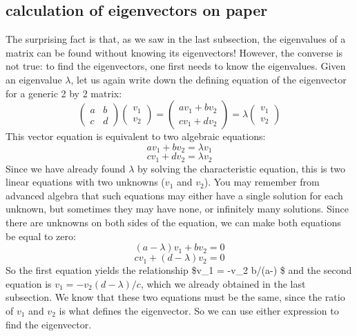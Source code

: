 \documentclass[
  letterpaper,
  DIV=11,
  numbers=noendperiod]{scrreprt}
\begin{document}
\hypertarget{calculation-of-eigenvectors-on-paper}{%
\subsection{calculation of eigenvectors on
paper}\label{calculation-of-eigenvectors-on-paper}}

The surprising fact is that, as we saw in the last subsection, the
eigenvalues of a matrix can be found without knowing its eigenvectors!
However, the converse is not true: to find the eigenvectors, one first
needs to know the eigenvalues. Given an eigenvalue \(\lambda\), let us
again write down the defining equation of the eigenvector for a generic
2 by 2 matrix:
\[  \left(\begin{array}{cc}a & b \\c & d\end{array}\right)\left(\begin{array}{c}v_1 \\ v_2 \end{array}\right) = \left(\begin{array}{c}av_1 +b v_2\\ cv_1+ dv_2 \end{array}\right) = \lambda \left(\begin{array}{c}v_1 \\ v_2 \end{array}\right)  \]
This vector equation is equivalent to two algebraic equations: \[
av_1 + b v_2 = \lambda v_1
\] \[
cv_1 + d v_2 = \lambda v_2 
\] Since we have already found \(\lambda\) by solving the characteristic
equation, this is two linear equations with two unknowns (\(v_1\) and
\(v_2\)). You may remember from advanced algebra that such equations may
either have a single solution for each unknown, but sometimes they may
have none, or infinitely many solutions. Since there are unknowns on
both sides of the equation, we can make both equations be equal to zero:
\[
(a-\lambda)v_1 + b v_2 = 0
\] \[
cv_1 + (d-\lambda ) v_2 =0
\] So the first equation yields the relationship \$v\_1 = -v\_2
b/(a-\lambda) \$ and the second equation is \(v_1 = -v_2(d-\lambda)/c\),
which we already obtained in the last subsection. We know that these two
equations must be the same, since the ratio of \(v_1\) and \(v_2\) is
what defines the eigenvector. So we can use either expression to find
the eigenvector.
\end{document}
